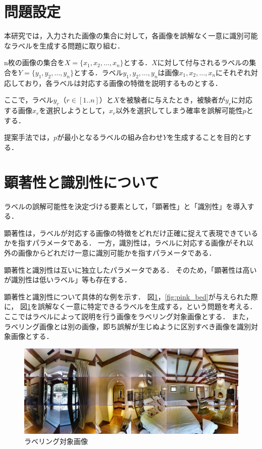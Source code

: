 \documentclass[a4paper,11pt]{jreport}
\begin{document}
\section{問題設定}

本研究では，入力された画像の集合に対して，各画像を誤解なく一意に識別可能なラベルを生成する問題に取り組む．

n枚の画像の集合を\(X = \{x_1, x_2, \ldots, x_n\}\)とする．\(X\)に対して付与されるラベルの集合を\(Y = \{y_1, y_2, \ldots, y_n\}\)とする．ラベル\(y_1, y_2, \ldots, y_n\)は画像\(x_1, x_2, \ldots, x_n\)にそれぞれ対応しており，各ラベルは対応する画像の特徴を説明するものとする．

ここで，ラベル\(y_r\)（$r \in [1..n]$）と\(X\)を被験者に与えたとき，被験者が\(y_r\)に対応する画像\(x_r\)を選択しようとして，\(x_r\)以外を選択してしまう確率を誤解可能性\(p\)とする．

提案手法では，\(p\)が最小となるラベルの組み合わせ\(Y\)を生成することを目的とする．

\section{顕著性と識別性について}

ラベルの誤解可能性を決定づける要素として，「顕著性」と「識別性」を導入する．

顕著性は，ラベルが対応する画像の特徴をどれだけ正確に捉えて表現できているかを指すパラメータである．
一方，識別性は，ラベルに対応する画像がそれ以外の画像からどれだけ一意に識別可能かを指すパラメータである．

顕著性と識別性は互いに独立したパラメータである．
そのため，「顕著性は高いが識別性は低いラベル」等も存在する．

顕著性と識別性について具体的な例を示す．
図\ref{fig:white_bed}，\ref*{fig:pink_bed}が与えられた際に，
図\ref{fig:white_bed}を誤解なく一意に特定できるラベルを生成する，という問題を考える．
ここではラベルによって説明を行う画像をラベリング対象画像とする．
また，ラベリング画像とは別の画像，即ち誤解が生じぬように区別すべき画像を識別対象画像とする．

\begin{figure}[H]
	\centering
	\includegraphics[width=0.8\linewidth]{figures/3-2_white_bed.jpg}
	\caption{ラベリング対象画像}
	\label{fig:white_bed}
\end{figure}
\end{document}
